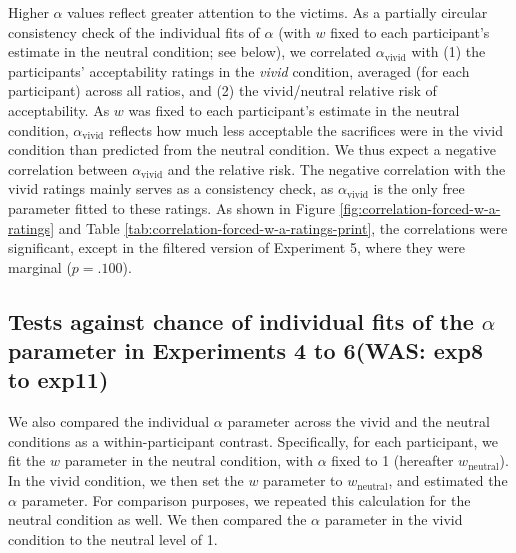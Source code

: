 \documentclass[
]{article}
\begin{document}
Higher \(\alpha\) values reflect greater attention to the victims. As a partially circular consistency check of the individual fits of \(\alpha\) (with \(w\) fixed to each participant's estimate in the neutral condition; see below), we correlated \(\alpha_\text{vivid}\) with (1) the participants' acceptability ratings in the \emph{vivid} condition, averaged (for each participant) across all ratios, and (2) the vivid/neutral relative risk of acceptability. As \(w\) was fixed to each participant's estimate in the neutral condition, \(\alpha_\text{vivid}\) reflects how much less acceptable the sacrifices were in the vivid condition than predicted from the neutral condition. We thus expect a negative correlation between \(\alpha_\text{vivid}\) and the relative risk. The negative correlation with the vivid ratings mainly serves as a consistency check, as \(\alpha_\text{vivid}\) is the only free parameter fitted to these ratings. As shown in Figure \ref{fig:correlation-forced-w-a-ratings} and Table \ref{tab:correlation-forced-w-a-ratings-print}, the correlations were significant, except in the filtered version of Experiment 5, where they were marginal (\(p = .100\)).

\subsection{\texorpdfstring{Tests against chance of individual fits of the \(\alpha\) parameter in Experiments 4 to 6(WAS: exp8 to exp11)}{Tests against chance of individual fits of the \textbackslash alpha parameter in Experiments 4 to 6(WAS: exp8 to exp11)}}\label{tests-against-chance-of-individual-fits-of-the-alpha-parameter-in-experiments-4-to-6was-exp8-to-exp11}

We also compared the individual \(\alpha\) parameter across the vivid and the neutral conditions as a within-participant contrast. Specifically, for each participant, we fit the \(w\) parameter in the neutral condition, with \(\alpha\) fixed to 1 (hereafter \(w_\text{neutral}\)). In the vivid condition, we then set the \(w\) parameter to \(w_\text{neutral}\), and estimated the \(\alpha\) parameter. For comparison purposes, we repeated this calculation for the neutral condition as well. We then compared the \(\alpha\) parameter in the vivid condition to the neutral level of 1.
\end{document}
